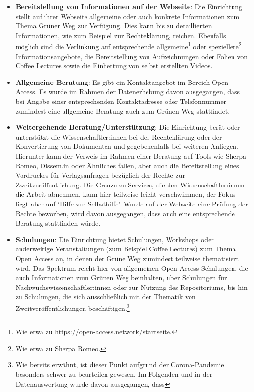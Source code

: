 \documentclass[a4paper,
fontsize=11pt,
oneside,
numbers=noperiodatend,
parskip=half-,
bibliography=totoc,
final
]{scrartcl}
\begin{document}
\begin{itemize}
\item
  \textbf{Bereitstellung von Informationen auf der Webseite}: Die
  Einrichtung stellt auf ihrer Webseite allgemeine oder auch konkrete
  Informationen zum Thema Grüner Weg zur Verfügung. Dies kann bis zu
  detaillierten Informationen, wie zum Beispiel zur Rechteklärung,
  reichen. Ebenfalls möglich sind die Verlinkung auf entsprechende
  allgemeine\footnote{Wie etwa zu
    \url{https://open-access.network/startseite}.} oder
  speziellere\footnote{Wie etwa zu Sherpa Romeo.} Informationsangebote,
  die Bereitstellung von Aufzeichnungen oder Folien von Coffee Lectures
  sowie die Einbettung von selbst erstellten Videos.
\item
  \textbf{Allgemeine Beratung}: Es gibt ein Kontaktangebot im Bereich
  Open Access. Es wurde im Rahmen der Datenerhebung davon ausgegangen,
  dass bei Angabe einer entsprechenden Kontaktadresse oder Telefonnummer
  zumindest eine allgemeine Beratung auch zum Grünen Weg stattfindet.
\item
  \textbf{Weitergehende Beratung/Unterstützung}: Die Einrichtung berät
  oder unterstützt die Wissenschaftler:innen bei der Rechteklärung oder
  der Konvertierung von Dokumenten und gegebenenfalls bei weiteren
  Anliegen. Hierunter kann der Verweis im Rahmen einer Beratung auf
  Tools wie Sherpa Romeo, Dissem.in oder Ähnliches fallen, aber auch die
  Bereitstellung eines Vordruckes für Verlagsanfragen bezüglich der
  Rechte zur Zweitveröffentlichung. Die Grenze zu Services, die den
  Wissenschaftler:innen die Arbeit abnehmen, kann hier teilweise leicht
  verschwimmen, der Fokus liegt aber auf \enquote*{Hilfe zur Selbsthilfe}. Wurde
  auf der Webseite eine Prüfung der Rechte beworben, wird davon
  ausgegangen, dass auch eine entsprechende Beratung stattfinden würde.
\item
  \textbf{Schulungen}: Die Einrichtung bietet Schulungen, Workshops oder
  anderweitige Veranstaltungen (zum Beispiel Coffee Lectures) zum Thema
  Open Access an, in denen der Grüne Weg zumindest teilweise
  thematisiert wird. Das Spektrum reicht hier von allgemeinen
  Open-Access-Schulungen, die auch Informationen zum Grünen Weg
  beinhalten, über Schulungen für Nachwuchswissenschaftler:innen oder
  zur Nutzung des Repositoriums, bis hin zu Schulungen, die sich
  ausschließlich mit der Thematik von Zweitveröffentlichungen
  beschäftigen.\footnote{Wie bereits erwähnt, ist dieser Punkt aufgrund
    der Corona-Pandemie besonders schwer zu beurteilen gewesen. Im
    Folgenden und in der Datenauswertung wurde davon ausgegangen, dass
}
\end{itemize}
\end{document}
